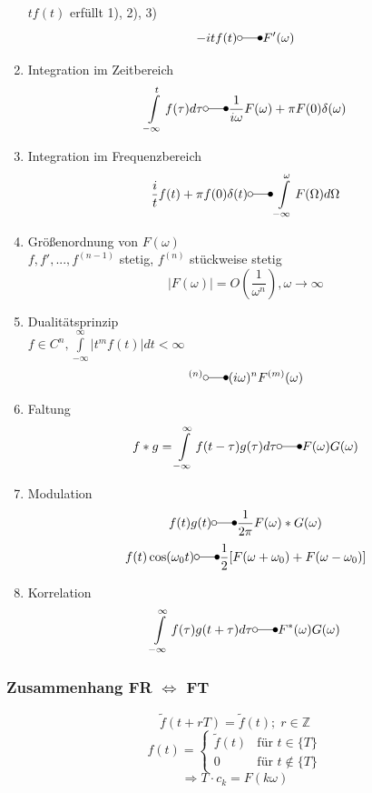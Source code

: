 \documentclass[a4paper,twocolumn,10pt]{article}
\begin{document}
\begin{enumerate}[label=$\bullet$]
$tf(t)$ erfüllt 1), 2), 3)
\begin{equation*}
-itf(t)\laplace F'(\omega)
\end{equation*}
\item Integration im Zeitbereich
\begin{equation*}
\int\limits_{-\infty}^{t}f(\tau)d\tau \laplace \frac{1}{i\omega}F(\omega)+\pi F(0)\delta(\omega)
\end{equation*}
\item Integration im Frequenzbereich
\begin{equation*}
\frac{i}{t}f(t)+\pi f(0)\delta(t)\laplace \int\limits_{-\infty}^{\omega}F(\Omega)d\Omega
\end{equation*}
\item Größenordnung von $F(\omega)$\\
$f,f',...,f^{(n-1)}$ stetig, $f^{(n)}$ stückweise stetig
\begin{equation*}
|F(\omega)|=O\left(\frac{1}{\omega^n}\right), \omega\rightarrow\infty
\end{equation*}
\item Dualitätsprinzip\\
$f\in C^n, \int\limits_{-\infty}^{\infty}|t^mf(t)|dt<\infty$
\begin{equation*}
[(-it)^mf(t)]^{(n)}\laplace (i\omega)^n F^{(m)}(\omega)
\end{equation*}
\item Faltung
\begin{equation*}
f*g=\int\limits_{-\infty}^{\infty}f(t-\tau)g(\tau)d\tau\laplace F(\omega)G(\omega)
\end{equation*}
\item Modulation
\begin{equation*}
f(t)g(t)\laplace \frac{1}{2\pi}F(\omega)*G(\omega)
\end{equation*}
\begin{equation*}
f(t)\cos(\omega_0 t)\laplace \frac{1}{2}[F(\omega+\omega_0)+F(\omega-\omega_0)]
\end{equation*}
\item Korrelation
\begin{equation*}
\int\limits_{-\infty}^{\infty}f(\tau)g(t+\tau)d\tau\laplace F^*(\omega)G(\omega)
\end{equation*}
\end{enumerate}

\subsubsection{Zusammenhang FR $\Leftrightarrow$ FT}
\begin{equation*}
\tilde{f}(t+rT)=\tilde{f}(t);\;r\in\mathbb{Z}
\end{equation*}
\begin{equation*}
f(t)=\begin{cases}\tilde{f}(t) & \text{für }t\in\{T\} \\ 0 & \text{für }t\notin\{T\}\end{cases}
\end{equation*}
\begin{equation*}
\Rightarrow T\cdot c_k=F(k\omega)
\end{equation*}
\end{document}
